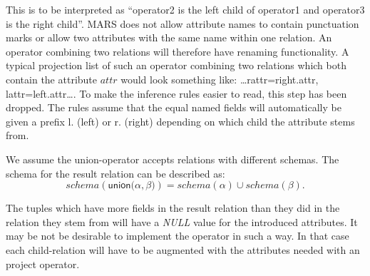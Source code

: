 This is to be interpreted as ``\textsf{operator2} is the left child of \textsf{operator1} and \textsf{operator3} is
the right child''. MARS does not allow attribute names to contain punctuation marks or allow two attributes with the
same name within one relation. An operator combining two relations will therefore have renaming functionality. A
typical projection list of such an operator combining two relations which both contain the attribute $attr$ would
look something like: \textsf{\ldots rattr=right.attr, lattr=left.attr\ldots}. To make the inference rules
easier to read, this step has been dropped. The rules assume that the equal
named fields will automatically be given a prefix \textsf{l.} (left) or
\textsf{r.} (right) depending on which child the attribute stems from.

We assume the \textsf{union}-operator accepts relations with different schemas. The schema for the result
relation can be described as:
\begin{equation*}
schema(\textsf{union(}\alpha, \beta\texttt{)}) = schema(\alpha) \cup schema(\beta).
\end{equation*}

The tuples which have more fields in the result relation than they did in the relation they stem from will
have a \textit{NULL} value for the introduced attributes. It may be not be
desirable to implement the operator in such a way. In that case each
child-relation will have to be augmented with the attributes needed with an \textsf{project} operator.
